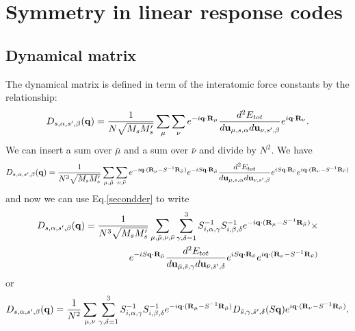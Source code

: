 \documentclass[12pt,a4paper,twoside]{report}
\begin{document}
{\color{dark-blue}\chapter{Symmetry in linear response codes}}
\color{black}

\section{Dynamical matrix}

The dynamical matrix is defined in term of the interatomic force constants by the relationship:
\begin{equation}
D_{s,\alpha,s',\beta}({\bf q}) =
{1 \over N \sqrt{M_s M_s'}} \sum_{\mu} \sum_{\nu}
e^{-i {\bf q} \cdot {\bf R}_\mu}
{d^2 E_{tot} \over d {\bf u}_{\mu,s,\alpha} d {\bf u}_{\nu,s',\beta}}
e^{i {\bf q} \cdot {\bf R}_\nu}.
\label{dyn_mat}
\end{equation}
We can insert a sum over $\bar \mu$ and a sum over
$\bar \nu$ and divide by $N^2$. We have
\begin{equation}
D_{s,\alpha,s',\beta}({\bf q}) =
{1 \over N^3 \sqrt{M_s M_s'}} \sum_{\mu,\bar \mu} \sum_{\nu,\bar \nu}
e^{-i {\bf q} \cdot ({\bf R}_\mu - S^{-1}{\bf R}_{\bar \mu}) }
e^{-i S {\bf q} \cdot {\bf R}_{\bar \mu}}
{d^2 E_{tot} \over d {\bf u}_{\mu,s,\alpha} d {\bf u}_{\nu,s',\beta}}
e^{i S {\bf q} \cdot {\bf R}_{\bar \nu}}
e^{i {\bf q} \cdot ({\bf R}_\nu - S^{-1}{\bf R}_{\bar \nu})}
\end{equation}
and now we can use Eq.\ref{secondder} to write
\begin{eqnarray}
D_{s,\alpha,s',\beta}({\bf q}) =
{1 \over N^3 \sqrt{M_s M_s'}} \sum_{\mu,\bar \mu, \nu,\bar \nu} \sum_{\gamma,\delta=1}^3  S^{-1}_{i,\alpha,\gamma} S^{-1}_{i,\beta,\delta}
e^{-i {\bf q} \cdot ({\bf R}_\mu - S^{-1}{\bf R}_{\bar \mu}) } \times \nonumber \\
e^{-i S{\bf q} \cdot {\bf R}_{\bar \mu}}
{d^2 E_{tot} \over d {\bf u}_{{\bar \mu},{\bar s},\gamma}d {\bf u}_{{\bar \nu},{\bar s}',\delta} }
e^{i S{\bf q} \cdot {\bf R}_{\bar \nu}}
e^{i {\bf q} \cdot ({\bf R}_\nu - S^{-1}{\bf R}_{\bar \nu})}
\end{eqnarray}
or
\begin{equation}
D_{s,\alpha,s',\beta}({\bf q}) =
{1 \over N^2 }\sum_{\mu, \nu} \sum_{\gamma,\delta=1}^3  S^{-1}_{i,\alpha,\gamma} S^{-1}_{i,\beta,\delta}
e^{-i {\bf q} \cdot ({\bf R}_\mu - S^{-1}{\bf R}_{\bar \mu}) }
D_{\bar s,\gamma,\bar s',\delta}(S{\bf q})
e^{i {\bf q} \cdot ({\bf R}_\nu - S^{-1}{\bf R}_{\bar \nu})}.
\end{equation}
\end{document}

